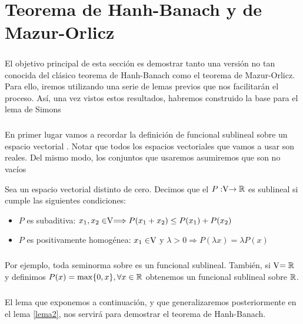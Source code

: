 \chapter{Teorema de Hanh-Banach y de Mazur-Orlicz}
	\thispagestyle{empty}
	\paragraph{}El objetivo principal de esta sección es demostrar tanto una versión no tan conocida del clásico teorema de Hanh-Banach como el teorema de Mazur-Orlicz. Para ello, iremos utilizando una serie de lemas previos que nos facilitarán el proceso. Así, una vez vistos estos resultados, habremos construido la base para el lema de Simons 
	
	\paragraph{} En primer lugar vamos a recordar la definición de funcional sublineal sobre un espacio vectorial \vecSpace . Notar que todos los espacios vectoriales que vamos a usar son reales. Del mismo modo, los conjuntos que usaremos asumiremos que son no vacíos
	
	\begin{definicion}
		Sea \vecSpace un espacio vectorial distinto de cero. Decimos que el $P:\vecSpace \rightarrow \RR$ es sublineal si cumple las siguientes condiciones:
		\begin{itemize}
			\item $ P $ es subaditiva: $x_1, x_2 \in \vecSpace \Longrightarrow P(x_1 + x_2) \leq P(x_1) + P(x_2) $
			\item $ P $ es positivamente homogénea: $x_1 \in \vecSpace $ y $ \lambda > 0 \Longrightarrow P(\lambda x) = \lambda P(x) $
		\end{itemize}
	\end{definicion}

	\paragraph{}Por ejemplo, toda seminorma sobre \vecSpace es un funcional sublineal. También, si $ \vecSpace = \RR $ y definimos $ P(x) = \max \{0,x\}, \forall x \in \mathbb{R} $ obtenemos un funcional sublineal sobre $\mathbb{R}$.
	
	\paragraph{} El lema que exponemos a continuación, y que generalizaremos posteriormente en el lema \ref{lema2}, nos servirá para demostrar el teorema de Hanh-Banach. 
	
